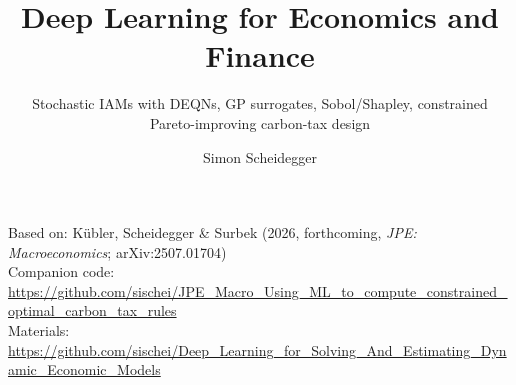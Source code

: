 \documentclass[aspectratio=1610]{beamer}
\title[Deep Learning for Dynamic Economic Models]{Deep Learning for Economics and Finance}
\subtitle{Stochastic IAMs with DEQNs, GP surrogates, Sobol/Shapley, constrained Pareto-improving carbon-tax design}
\author{Simon Scheidegger}
\institute[HEC Lausanne]{HEC, University of Lausanne}
\date{}
\begin{document}
{
\begin{frame}
\titlepage
\vspace{-0.4cm}
\begin{center}
{\footnotesize Based on: K\"ubler, Scheidegger \& Surbek (2026, forthcoming, \textit{JPE: Macroeconomics}; arXiv:2507.01704)}\\[2pt]
{\footnotesize Companion code: \url{https://github.com/sischei/JPE_Macro_Using_ML_to_compute_constrained_optimal_carbon_tax_rules}}\\[4pt]
{\footnotesize Materials: \url{https://github.com/sischei/Deep_Learning_for_Solving_And_Estimating_Dynamic_Economic_Models}}
\end{center}
\end{frame}
}

\end{document}
